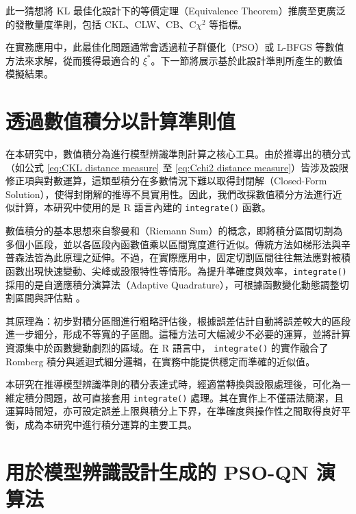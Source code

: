 \hspace*{8mm}此一猜想將 KL 最佳化設計下的等價定理（Equivalence Theorem）推廣至更廣泛的發散量度準則，包括 CKL、CLW、CB、C$\chi^2$ 等指標。

\hspace*{8mm} 在實務應用中，此最佳化問題通常會透過粒子群優化（PSO）或 L-BFGS 等數值方法來求解，從而獲得最適合的 $\xi^*$。下一節將展示基於此設計準則所產生的數值模擬結果。

\section{透過數值積分以計算準則值} \label{SEC: Numerical Integration}

\hspace*{8mm} 在本研究中，數值積分為進行模型辨識準則計算之核心工具。由於推導出的積分式（如公式 \eqref{eq:CKL distance measure} 至 \eqref{eq:Cchi2 distance measure}）皆涉及設限修正項與對數運算，這類型積分在多數情況下難以取得封閉解（Closed-Form Solution），使得封閉解的推導不具實用性。因此，我們改採數值積分方法進行近似計算，本研究中使用的是 R 語言內建的 \verb|integrate()| 函數。

\hspace*{8mm} 數值積分的基本思想來自黎曼和（Riemann Sum）的概念，即將積分區間切割為多個小區段，並以各區段內函數值乘以區間寬度進行近似。傳統方法如梯形法與辛普森法皆為此原理之延伸。不過，在實際應用中，固定切割區間往往無法應對被積函數出現快速變動、尖峰或設限特性等情形。為提升準確度與效率，\verb|integrate()| 採用的是自適應積分演算法（Adaptive Quadrature），可根據函數變化動態調整切割區間與評估點 \citep{davis2007methods}。

\hspace*{8mm} 其原理為：初步對積分區間進行粗略評估後，根據誤差估計自動將誤差較大的區段進一步細分，形成不等寬的子區間。這種方法可大幅減少不必要的運算，並將計算資源集中於函數變動劇烈的區域。在 R 語言中， \verb|integrate()| 的實作融合了 Romberg 積分與遞迴式細分邏輯，在實務中能提供穩定而準確的近似值\citep{stoer1980introduction}。

\hspace*{8mm} 本研究在推導模型辨識準則的積分表達式時，經適當轉換與設限處理後，可化為一維定積分問題，故可直接套用 \verb|integrate()| 處理。其在實作上不僅語法簡潔，且運算時間短，亦可設定誤差上限與積分上下界，在準確度與操作性之間取得良好平衡，成為本研究中進行積分運算的主要工具。

\section{用於模型辨識設計生成的 PSO-QN 演算法}

